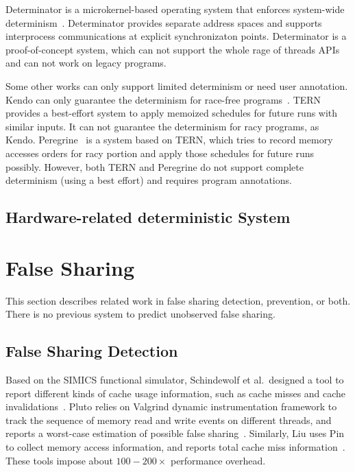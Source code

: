 Determinator is a microkernel-based operating system that enforces
system-wide determinism~\cite{efficient-system-enforced}.
Determinator provides separate address spaces and supports interprocess
communications at explicit synchronizaton points. 
Determinator is a proof-of-concept system, which can not support the whole rage of
threads APIs and can not work on legacy programs.  

Some other works can only support limited determinism or need user annotation.
Kendo can only guarantee the determinism for race-free programs~\cite{1508256}. 
TERN~\cite{stable-deterministic} provides a best-effort system to 
apply memoized schedules for future runs with similar inputs. 
It can not guarantee the determinism for racy programs, as Kendo. 
Peregrine~\cite{peregrine:sosp11} is a system based on TERN, which tries to record
 memory accesses orders for racy portion and apply those schedules for future runs possibly.
However, both TERN and Peregrine do not support complete determinism (using a best effort)
and requires program annotations. 

\subsection{Hardware-related deterministic System}

\section{False Sharing}

This section describes related work in false sharing detection, prevention, or both. There is no previous
system to predict unobserved false sharing.

\subsection{False Sharing Detection}
Based on the SIMICS functional simulator, Schindewolf et al.\ designed a tool to report different kinds of cache usage information, such as cache misses and cache invalidations~\cite{falseshare:simulator}. Pluto relies on Valgrind dynamic instrumentation framework to track the sequence of memory read and write events on different threads, and reports a worst-case estimation of possible false sharing~\cite{falseshare:binaryinstrumentation1}.
Similarly, Liu uses Pin to collect memory access information, and reports total cache miss information~\cite{falseshare:binaryinstrumentation2}.
These tools impose about $100-200\times$ performance overhead.

